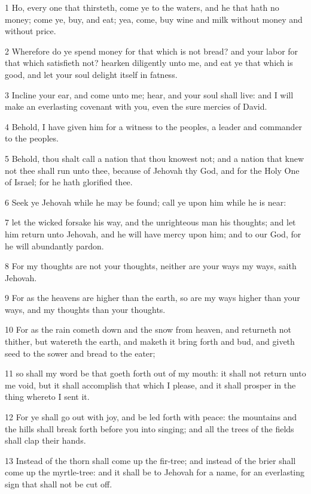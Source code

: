 \par 1 Ho, every one that thirsteth, come ye to the waters, and he that hath no money; come ye, buy, and eat; yea, come, buy wine and milk without money and without price.
\par 2 Wherefore do ye spend money for that which is not bread? and your labor for that which satisfieth not? hearken diligently unto me, and eat ye that which is good, and let your soul delight itself in fatness.
\par 3 Incline your ear, and come unto me; hear, and your soul shall live: and I will make an everlasting covenant with you, even the sure mercies of David.
\par 4 Behold, I have given him for a witness to the peoples, a leader and commander to the peoples.
\par 5 Behold, thou shalt call a nation that thou knowest not; and a nation that knew not thee shall run unto thee, because of Jehovah thy God, and for the Holy One of Israel; for he hath glorified thee.
\par 6 Seek ye Jehovah while he may be found; call ye upon him while he is near:
\par 7 let the wicked forsake his way, and the unrighteous man his thoughts; and let him return unto Jehovah, and he will have mercy upon him; and to our God, for he will abundantly pardon.
\par 8 For my thoughts are not your thoughts, neither are your ways my ways, saith Jehovah.
\par 9 For as the heavens are higher than the earth, so are my ways higher than your ways, and my thoughts than your thoughts.
\par 10 For as the rain cometh down and the snow from heaven, and returneth not thither, but watereth the earth, and maketh it bring forth and bud, and giveth seed to the sower and bread to the eater;
\par 11 so shall my word be that goeth forth out of my mouth: it shall not return unto me void, but it shall accomplish that which I please, and it shall prosper in the thing whereto I sent it.
\par 12 For ye shall go out with joy, and be led forth with peace: the mountains and the hills shall break forth before you into singing; and all the trees of the fields shall clap their hands.
\par 13 Instead of the thorn shall come up the fir-tree; and instead of the brier shall come up the myrtle-tree: and it shall be to Jehovah for a name, for an everlasting sign that shall not be cut off.

